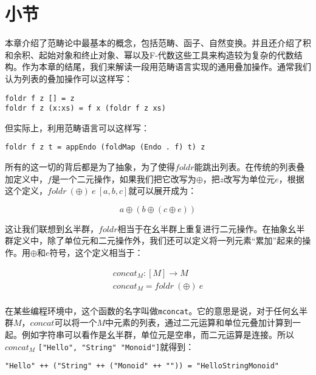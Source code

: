 \documentclass{article}
\begin{document}
\begin{Exercise}
\end{Exercise}

\section{小节}

本章介绍了范畴论中最基本的概念，包括范畴、函子、自然变换。并且还介绍了积和余积、起始对象和终止对象、幂以及F-代数这些工具来构造较为复杂的代数结构。作为本章的结尾，我们来解读一段用范畴语言实现的通用叠加操作\cite{Haskell-foldable}。通常我们认为列表的叠加操作可以这样写：

\lstset{language=Haskell, frame=single}
 \begin{lstlisting}
foldr f z [] = z
foldr f z (x:xs) = f x (foldr f z xs)
\end{lstlisting}

但实际上，利用范畴语言可以这样写：

\lstset{frame=single}
\begin{lstlisting}
foldr f z t = appEndo (foldMap (Endo . f) t) z
\end{lstlisting}

所有的这一切的背后都是为了抽象，为了使得$foldr$能跳出列表。在传统的列表叠加定义中，$f$是一个二元操作，如果我们把它改写为$\oplus$，把$z$改写为单位元$e$，根据这个定义，$foldr\ (\oplus)\ e\ [a, b, c]$就可以展开成为：

\[
a \oplus (b \oplus (c \oplus e))
\]

这让我们联想到幺半群，$foldr$相当于在幺半群上重复进行二元操作。在抽象幺半群定义中，除了单位元和二元操作外，我们还可以定义将一列元素“累加”起来的操作。用$\oplus$和$e$符号，这个定义相当于：

\[
\begin{array}{l}
concat_M : [M] \to M \\
concat_M = foldr\ (\oplus)\ e \\
\end{array}
\]

在某些编程环境中，这个函数的名字叫做\texttt{mconcat}。它的意思是说，对于任何幺半群$M$，$concat$可以将一个$M$中元素的列表，通过二元运算和单位元叠加计算到一起。例如字符串可以看作是幺半群，单位元是空串，而二元运算是连接。所以$concat_M$ \texttt{["Hello", "String" "Monoid"]}就得到：

\begin{verbatim}
"Hello" ++ ("String" ++ ("Monoid" ++ "")) = "HelloStringMonoid"
\end{verbatim}
\end{document}
